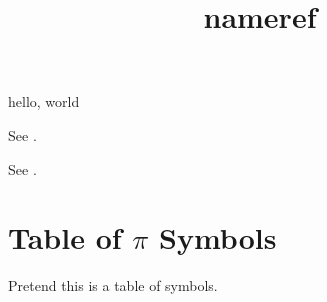 \documentclass{amsart}
\title{nameref}
\begin{document}
\maketitle

hello, world


See .

See .

\section*{Table of $\pi$ Symbols}\label{Chapter Table of Symbols}

Pretend this is a table of symbols.
\end{document}
